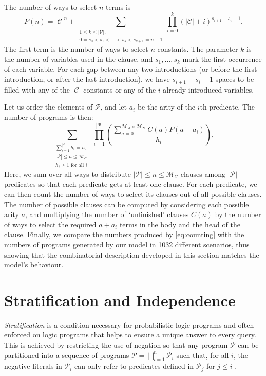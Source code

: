 \documentclass[runningheads]{llncs}
\newcommand{\predicates}{\mathcal{P}}
\newcommand{\variables}{\mathcal{V}}
\newcommand{\constants}{\mathcal{C}}
\newcommand{\maxArity}{\mathcal{M}_{\mathcal{A}}}
\newcommand{\maxNumNodes}{\mathcal{M}_{\mathcal{N}}}
\newcommand{\maxNumClauses}{\mathcal{M}_{\mathcal{C}}}
\begin{document}
The number of ways to select $n$ terms is
\[
  P(n) = |\constants{}|^n + \sum_{\substack{1 \le k \le |\variables{}|, \\ 0 =
      s_0 < s_1 < \dots < s_k < s_{k+1} = n+1}} \prod_{i=0}^k (|\constants{}| +
  i)^{s_{i+1} - s_i - 1}.
\]
The first term is the number of ways to select $n$ constants. The parameter $k$
is the number of variables used in the clause, and $s_1, \dots, s_k$ mark the
first occurrence of each variable. For each gap between any two introductions
(or before the first introduction, or after the last introduction), we have
$s_{i+1}-s_i-1$ spaces to be filled with any of the $|\constants{}|$ constants
or any of the $i$ already-introduced variables.

Let us order the elements of $\predicates{}$, and let $a_i$ be the arity of the
$i$th predicate. The number of programs is then:
\begin{equation} \label{eq:counting}
  \sum_{\substack{ \sum_{i=1}^{|\predicates{}|} h_i = n,\\
      |\predicates{}| \le n \le \maxNumClauses{},\\
      h_i \ge 1 \text{ for all } i}} \prod_{i=1}^{|\predicates{}|}
  \binom{\sum_{a=0}^{\maxArity{} \times \maxNumNodes{}} C(a) P(a+a_i)}{h_i},
\end{equation}
Here, we sum over all ways to distribute $|\predicates{}| \le n \le
\maxNumClauses{}$ clauses among $|\predicates{}|$ predicates so that each
predicate gets at least one clause. For each predicate, we can then count the
number of ways to select its clauses out of all possible clauses. The number of
possible clauses can be computed by considering each possible arity $a$, and
multiplying the number of `unfinished' clauses $C(a)$ by the number of ways to
select the required $a+a_i$ terms in the body and the head of the clause.
Finally, we compare the numbers produced by \eqref{eq:counting} with the numbers
of programs generated by our model in \num{1032} different scenarios, thus
showing that the combinatorial description developed in this section matches the
model's behaviour.

\section{Stratification and Independence} \label{sec:independence}

\emph{Stratification} is a condition necessary for probabilistic logic programs
\cite{DBLP:conf/padl/MantadelisR17} and often enforced on logic programs
\cite{DBLP:journals/tcs/Bidoit91} that helps to ensure a unique answer to every
query. This is achieved by restricting the use of negation so that any program
$\mathscr{P}$ can be partitioned into a sequence of programs $\mathscr{P} =
\bigsqcup_{i=1}^n \mathscr{P}_i$ such that, for all $i$, the negative literals
in $\mathscr{P}_i$ can only refer to predicates defined in $\mathscr{P}_j$ for
$j \le i$ \cite{DBLP:journals/tcs/Bidoit91}.
\end{document}
